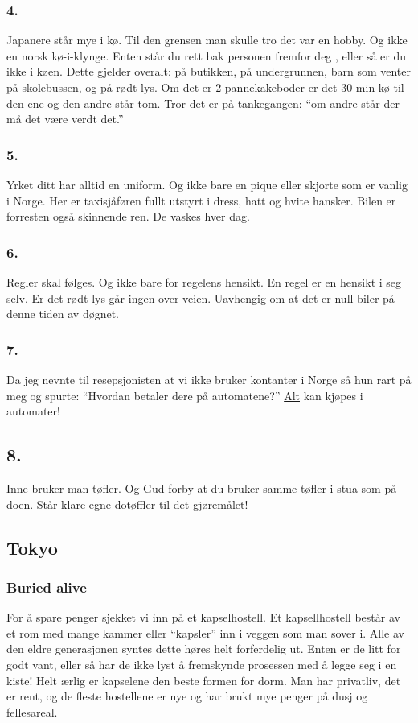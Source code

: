 \subsubsection{4.}
Japanere står mye i kø. Til den grensen man skulle
tro det var en hobby. Og ikke en norsk
kø-i-klynge. Enten står du rett bak personen fremfor deg
, eller så er du ikke i køen. Dette gjelder
overalt: på butikken, på undergrunnen, barn som venter på skolebussen,
og på rødt lys. Om det er 2 pannekakeboder er
det 30 min kø til den ene og den andre står tom. Tror
det er på tankegangen: ``om andre står der må det være verdt det.''  


\subsubsection{5.}
Yrket ditt har alltid en uniform. Og ikke bare en pique eller skjorte
som er vanlig i Norge. Her er taxisjåføren fullt utstyrt i dress, hatt
og hvite hansker. Bilen er forresten også skinnende ren. De vaskes
hver dag.

\subsubsection{6.}
Regler skal følges. Og ikke bare for regelens hensikt. En regel er en
hensikt i seg selv. Er det rødt lys går \underline{ingen} over veien.
Uavhengig om at det er null biler på denne tiden av døgnet.

\subsubsection{7.}
Da jeg nevnte til resepsjonisten at vi
ikke bruker kontanter i Norge så hun rart på meg og spurte: ``Hvordan
betaler dere på automatene?'' \underline{Alt} kan kjøpes i automater! 

\subsection{8.}
Inne bruker man tøfler. Og Gud forby at du bruker samme tøfler i stua
som på doen. Står klare egne dotøffler til det gjøremålet!

\subsection{Tokyo}

\subsubsection{Buried alive}
For å spare penger sjekket vi inn på et kapselhostell. Et
kapsellhostell består av et rom med mange kammer eller ``kapsler'' inn
i veggen som man sover i. Alle av den eldre generasjonen syntes dette
høres helt forferdelig ut. Enten er de litt for godt vant, eller så
har de ikke lyst å fremskynde prosessen med å legge seg i en kiste!
Helt ærlig er kapselene den beste formen for dorm. Man har privatliv,
det er rent, og de fleste hostellene er nye og har brukt mye penger på dusj og
fellesareal. 


